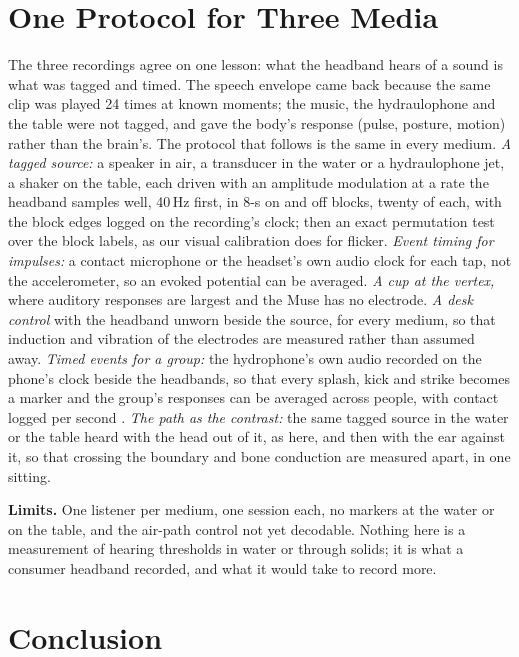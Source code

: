 \documentclass[conference]{IEEEtran}
\begin{document}
\section{One Protocol for Three Media}

The three recordings agree on one lesson: what the headband hears of a sound is what was tagged and timed. The speech envelope came back because the same clip was played 24 times at known moments; the music, the hydraulophone and the table were not tagged, and gave the body's response (pulse, posture, motion) rather than the brain's. The protocol that follows is the same in every medium. \emph{A tagged source:} a speaker in air, a transducer in the water or a hydraulophone jet, a shaker on the table, each driven with an amplitude modulation at a rate the headband samples well, 40\,Hz first, in 8-s on and off blocks, twenty of each, with the block edges logged on the recording's clock; then an exact permutation test over the block labels, as our visual calibration does for flicker. \emph{Event timing for impulses:} a contact microphone or the headset's own audio clock for each tap, not the accelerometer, so an evoked potential can be averaged. \emph{A cup at the vertex,} where auditory responses are largest and the Muse has no electrode. \emph{A desk control} with the headband unworn beside the source, for every medium, so that induction and vibration of the electrodes are measured rather than assumed away. \emph{Timed events for a group:} the hydrophone's own audio recorded on the phone's clock beside the headbands, so that every splash, kick and strike becomes a marker and the group's responses can be averaged across people, with contact logged per second \cite{picard1997affective}. \emph{The path as the contrast:} the same tagged source in the water or the table heard with the head out of it, as here, and then with the ear against it, so that crossing the boundary and bone conduction are measured apart, in one sitting.

\textbf{Limits.} One listener per medium, one session each, no markers at the water or on the table, and the air-path control not yet decodable. Nothing here is a measurement of hearing thresholds in water or through solids; it is what a consumer headband recorded, and what it would take to record more.

\section{Conclusion}
\end{document}
